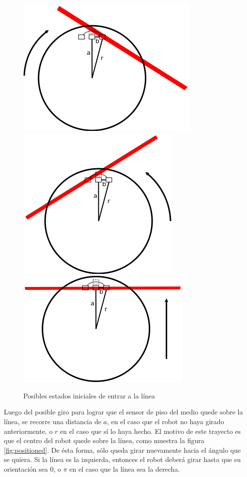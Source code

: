 \begin{figure}[htp]
\begin{center}
\includegraphics[scale=0.4]{comportamientos/floorSensorsLine.png}
\includegraphics[scale=0.4]{comportamientos/floorSensorsLine1.png}
\includegraphics[scale=0.4]{comportamientos/floorSensorsLine2.png}
\caption{Posibles estados iniciales de entrar a la l\'inea}
\label{fig:floorSensorsStates}
\end{center}
\end{figure}


Luego del posible giro para lograr que el sensor de piso del medio quede sobre la l\'inea, 
se recorre una distancia de $a$, en el caso que el robot no haya girado anteriormente, o $r$ en
el caso que s\'i lo haya hecho. El motivo de este trayecto es que el centro del robot quede
sobre la l\'inea, como muestra la figura \ref{fig:positioned}. De \'esta forma, s\'olo queda
girar nuevamente hacia el \'angulo que se quiera. Si la l\'inea es la izquierda, entonces el
robot deber\'a girar hasta que su orientaci\'on sea $0$, o $\pi$ en el caso que la l\'inea
sea la derecha.

